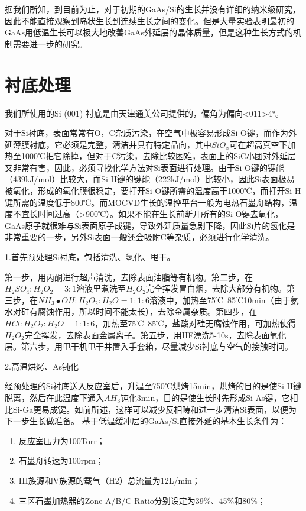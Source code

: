 据我们所知，到目前为止，对于初期的GaAs/Si的生长并没有详细的纳米级研究，因此不能直接观察到岛状生长到连续生长之间的变化。但是大量实验表明最初的GaAs用低温生长可以极大地改善GaAs外延层的晶体质量，但是这种生长方式的机制需要进一步的研究。


\section{衬底处理}

我们所使用的Si (001) 衬底是由天津通美公司提供的，偏角为偏向<011>4°。

对于Si衬底，表面常常有O，C杂质污染，在空气中极容易形成Si-O键，而作为外延薄膜衬底，它必须是完整，清洁并具有特定晶向，其中$SiO_x$可在超高真空下加热至1000℃把它除掉，但对于C污染，去除比较困难，表面上的SiC小团对外延层又非常有害，因此，必须寻找化学方法对Si表面进行处理。由于Si-O键的键能（439kJ/mol）比较大，而Si-H键的键能（222kJ/mol）比较小，因此Si表面极易被氧化，形成的氧化膜很稳定，要打开Si-O键所需的温度高于1000℃，而打开Si-H键所需的温度低于800℃。而MOCVD生长的温控平台一般为电热石墨舟结构，温度不宜长时间过高（>900℃）。如果不能在生长前断开所有的Si-O键去氧化，GaAs原子就很难与Si表面原子成键，导致外延质量急剧下降，因此Si片的氢化是非常重要的一步，另外Si表面一般还会吸附C等杂质，必须进行化学清洗。

1.首先预处理Si衬底，包括清洗、氢化、甩干。

第一步，用丙酮进行超声清洗，去除表面油脂等有机物。第二步，在$H_2 SO_4:H_2 O_2=3:1$溶液里煮洗至$H_2 O_2$完全挥发冒白烟，去除大部分有机物。第三步，在$NH_3•OH:H_2 O_2:H_2 O=1:1:6$溶液中，加热至75℃~85℃10min（由于氨水对硅有腐蚀作用，所以时间不能太长），去除金属杂质。第四步，在$HCl:H_2 O_2:H_2 O=1:1:6$，加热至75℃~85℃，盐酸对硅无腐蚀作用，可加热使得$H_2 O_2$完全挥发，去除表面金属离子。第五步，用HF漂洗5-10s，去除表面氧化层。第六步，用甩干机甩干并置入手套箱，尽量减少Si衬底与空气的接触时间。

2.高温烘烤、As钝化

经预处理的Si衬底送入反应室后，升温至750℃烘烤15min，烘烤的目的是使Si-H键脱离，然后在此温度下通入$AH_3$钝化3min，目的是使生长时先形成Si-As键，它相比Si-Ga更易成键。如前所述，这样可以减少反相畴和进一步清洁Si表面，以便为下一步生长做准备。
基于低温缓冲层的GaAs/Si直接外延的基本生长条件为：

\begin{enumerate}[(1)]
	\item 反应室压力为100Torr；
	\item 石墨舟转速为100rpm；
	\item III族源和V族源的载气（H2）总流量为12L/min；
	\item 三区石墨加热器的Zone A/B/C Ratio分别设定为39\%、45\%和80\%；
\end{enumerate}




